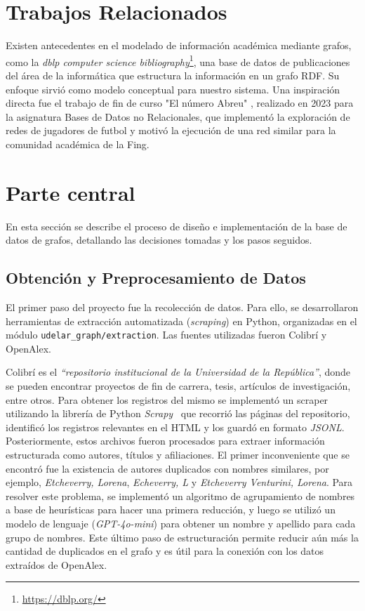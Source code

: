 \documentclass[journal]{IEEEtran}
\begin{document}
\section{Trabajos Relacionados}
\label{relacionados}
Existen antecedentes en el modelado de información académica mediante grafos, como la \textit{dblp computer science bibliography}\footnote{\url{https://dblp.org/}}, una base de datos de publicaciones del área de la informática que estructura la información en un grafo RDF. Su enfoque sirvió como modelo conceptual para nuestro sistema. Una inspiración directa fue el trabajo de fin de curso "El número Abreu" \cite{abreu2023}, realizado en 2023 para la asignatura Bases de Datos no Relacionales, que implementó la exploración de redes de jugadores de futbol y motivó la ejecución de una red similar para la comunidad académica de la Fing.

\section{Parte central}
\label{desarrollo}
En esta sección se describe el proceso de diseño e implementación de la base de datos de grafos, detallando las decisiones tomadas y los pasos seguidos.

\subsection{Obtención y Preprocesamiento de Datos}
El primer paso del proyecto fue la recolección de datos. Para ello, se desarrollaron herramientas de extracción automatizada (\textit{scraping}) en Python, organizadas en el módulo \texttt{udelar\_graph/extraction}. Las fuentes utilizadas fueron Colibrí y OpenAlex.

Colibrí es el \textit{``repositorio institucional de la Universidad de la República''}, donde se pueden encontrar proyectos de fin de carrera, tesis, artículos de investigación, entre otros. Para obtener los registros del mismo se implementó un scraper utilizando la librería de Python \emph{Scrapy}~\cite{scrapy} que recorrió las páginas del repositorio, identificó los registros relevantes en el HTML y los guardó en formato \emph{JSONL}.
Posteriormente, estos archivos fueron procesados para extraer información estructurada como autores, títulos y afiliaciones. El primer inconveniente que se encontró fue la existencia de autores duplicados con nombres similares, por ejemplo, \textit{Etcheverry, Lorena}, \textit{Echeverry, L} y \textit{Etcheverry Venturini, Lorena}. Para resolver este problema, se implementó un algoritmo de agrupamiento de nombres a base de heurísticas para hacer una primera reducción, y luego se utilizó un modelo de lenguaje (\emph{GPT-4o-mini}) para obtener un nombre y apellido para cada grupo de nombres. Este último paso de estructuración permite reducir aún más la cantidad de duplicados en el grafo y es útil para la conexión con los datos extraídos de OpenAlex.
\end{document}
